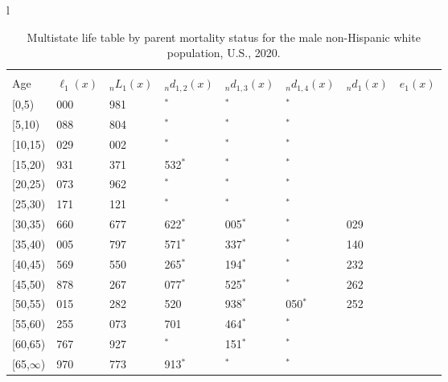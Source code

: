 \documentclass[
]{article}
\begin{document}
\begin{table}
\caption{\label{tab:table-nhwhite-male}Multistate life table by parent mortality status for the male non-Hispanic white population, U.S., 2020.}

\centering
\fontsize{9}{11}\selectfont
\begin{tabular}[t]{l}
\hline
\begin{tabular}{>{\raggedright\arraybackslash}p{.45in}>{\raggedleft\arraybackslash}p{.65in}>{\raggedleft\arraybackslash}p{.65in}>{\raggedleft\arraybackslash}p{.65in}>{\raggedleft\arraybackslash}p{.65in}>{\raggedleft\arraybackslash}p{.65in}>{\raggedleft\arraybackslash}p{.65in}>{\raggedleft\arraybackslash}p{.65in}}
\toprule
\multicolumn{1}{c}{ } & \multicolumn{7}{c}{(1) Lost neither} \\
\cmidrule(l{3pt}r{3pt}){2-8}
Age & $\ell_{1}(x)$ & ${}_nL_{1}(x)$ & ${}_nd_{1,2}(x)$ & ${}_nd_{1,3}(x)$ & ${}_nd_{1,4}(x)$ & ${}_nd_{1}(x)$ & $e_{1}(x)$\\
\midrule
{}[0,5) & 100 000 & 495 981 & 339$^{*}$ & 0$^{*}$ & 0$^{*}$ & 573 & 46\\
{}[5,10) & 99 088 & 490 804 & 0$^{*}$ & 0$^{*}$ & 0$^{*}$ & 59 & 42\\
{}[10,15) & 99 029 & 488 002 & 0$^{*}$ & 0$^{*}$ & 0$^{*}$ & 99 & 37\\
{}[15,20) & 98 931 & 477 371 & 1 532$^{*}$ & 0$^{*}$ & 0$^{*}$ & 326 & 32\\
{}[20,25) & 97 073 & 471 962 & 276$^{*}$ & 0$^{*}$ & 0$^{*}$ & 626 & 27\\
\addlinespace
{}[25,30) & 96 171 & 445 121 & 351$^{*}$ & 337$^{*}$ & 0$^{*}$ & 823 & 22\\
{}[30,35) & 94 660 & 422 677 & 2 622$^{*}$ & 2 005$^{*}$ & 0$^{*}$ & 1 029 & 18\\
{}[35,40) & 89 005 & 391 797 & 2 571$^{*}$ & 2 337$^{*}$ & 388$^{*}$ & 1 140 & 14\\
{}[40,45) & 82 569 & 351 550 & 4 265$^{*}$ & 1 194$^{*}$ & 0$^{*}$ & 1 232 & 10\\
{}[45,50) & 75 878 & 273 267 & 4 077$^{*}$ & 1 525$^{*}$ & 0$^{*}$ & 1 262 & 6\\
\addlinespace
{}[50,55) & 69 015 & 186 282 & 4 520 & 1 938$^{*}$ & 1 050$^{*}$ & 1 252 & 4\\
{}[55,60) & 60 255 & 86 073 & 4 701 & 1 464$^{*}$ & 448$^{*}$ & 875 & 2\\
{}[60,65) & 52 767 & 43 927 & 589$^{*}$ & 1 151$^{*}$ & 406$^{*}$ & 651 & 1\\
{}[65,$\infty$) & 49 970 & 7 773 & 2 913$^{*}$ & 362$^{*}$ & 777$^{*}$ & 451 & 0\\

\end{tabular}
\end{tabular}
\end{table}
\end{document}
